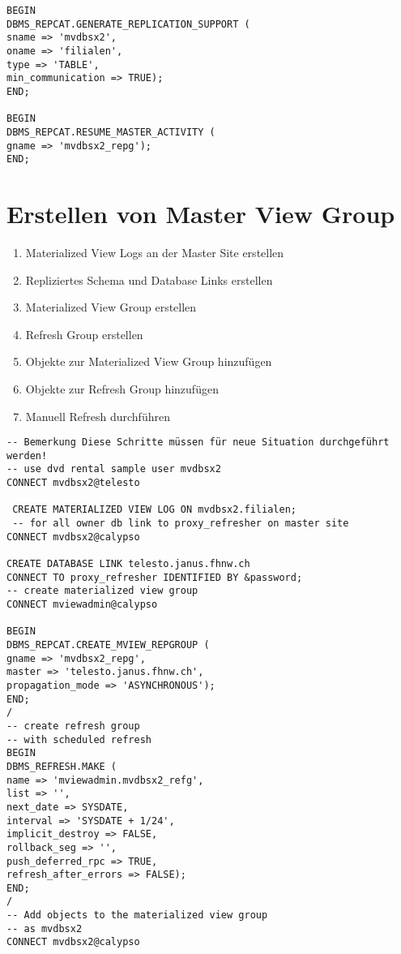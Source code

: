 \documentclass[a4paper,10pt,titlepage=false]{scrreprt}
\begin{document}
\begin{itemize}
\begin{lstlisting}[caption=Erstellen von Master Group,style=sql]
BEGIN
DBMS_REPCAT.GENERATE_REPLICATION_SUPPORT (
sname => 'mvdbsx2',
oname => 'filialen',
type => 'TABLE',
min_communication => TRUE);
END;

BEGIN
DBMS_REPCAT.RESUME_MASTER_ACTIVITY (
gname => 'mvdbsx2_repg');
END;

\end{lstlisting}

\section{Erstellen von Master View Group} %
\label{sec:erstellen_von_master_view_group}
\begin{enumerate}
  \item Materialized View Logs an der Master Site erstellen
\item Repliziertes Schema und Database Links erstellen
\item  Materialized View Group erstellen
\item  Refresh Group erstellen
\item Objekte zur Materialized View Group hinzufügen
\item Objekte zur Refresh Group hinzufügen
\item Manuell Refresh durchführen
\end{enumerate}
\begin{lstlisting}[caption=Master View Group erstellen,style=sql]
  -- Bemerkung Diese Schritte müssen für neue Situation durchgeführt werden!
-- use dvd rental sample user mvdbsx2
CONNECT mvdbsx2@telesto

 CREATE MATERIALIZED VIEW LOG ON mvdbsx2.filialen;
 -- for all owner db link to proxy_refresher on master site
CONNECT mvdbsx2@calypso

CREATE DATABASE LINK telesto.janus.fhnw.ch
CONNECT TO proxy_refresher IDENTIFIED BY &password;
-- create materialized view group
CONNECT mviewadmin@calypso

BEGIN
DBMS_REPCAT.CREATE_MVIEW_REPGROUP (
gname => 'mvdbsx2_repg',
master => 'telesto.janus.fhnw.ch',
propagation_mode => 'ASYNCHRONOUS');
END;
/
-- create refresh group
-- with scheduled refresh
BEGIN
DBMS_REFRESH.MAKE (
name => 'mviewadmin.mvdbsx2_refg',
list => '',
next_date => SYSDATE,
interval => 'SYSDATE + 1/24',
implicit_destroy => FALSE,
rollback_seg => '',
push_deferred_rpc => TRUE,
refresh_after_errors => FALSE);
END;
/
-- Add objects to the materialized view group
-- as mvdbsx2
CONNECT mvdbsx2@calypso


\end{lstlisting}
\end{itemize}
\end{document}
